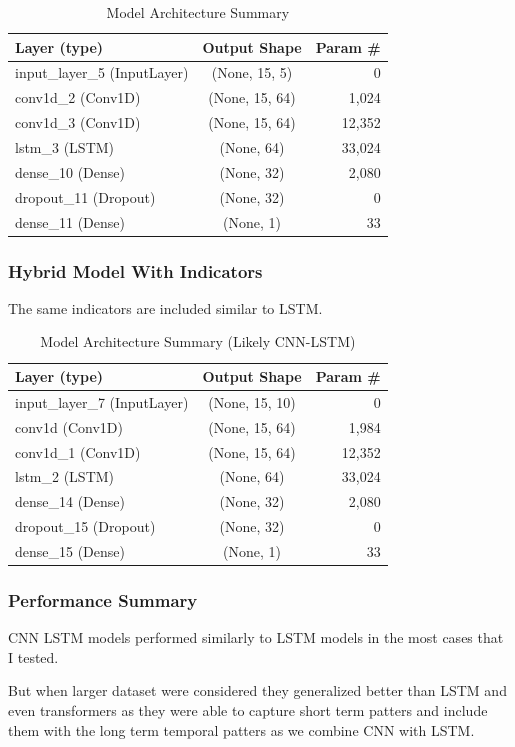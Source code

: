 \begin{table}[h]
\centering
\caption{Model Architecture Summary}
\label{tab:cnn_lstm_summary}
\begin{tabular}{|l|c|r|}
\hline
\textbf{Layer (type)} & \textbf{Output Shape} & \textbf{Param \#} \\
\hline
input\_layer\_5 (InputLayer) & (None, 15, 5) & 0 \\
\hline
conv1d\_2 (Conv1D) & (None, 15, 64) & 1,024 \\
\hline
conv1d\_3 (Conv1D) & (None, 15, 64) & 12,352 \\
\hline
lstm\_3 (LSTM) & (None, 64) & 33,024 \\
\hline
dense\_10 (Dense) & (None, 32) & 2,080 \\
\hline
dropout\_11 (Dropout) & (None, 32) & 0 \\
\hline
dense\_11 (Dense) & (None, 1) & 33 \\
\hline
\end{tabular}
\end{table}

\subsubsection{Hybrid Model With Indicators}

The same indicators are included similar to LSTM.

\begin{table}[h]
\centering
\caption{Model Architecture Summary (Likely CNN-LSTM)}
\label{tab:cnn_lstm_summary_2}
\begin{tabular}{|l|c|r|}
\hline
\textbf{Layer (type)} & \textbf{Output Shape} & \textbf{Param \#} \\
\hline
input\_layer\_7 (InputLayer) & (None, 15, 10) & 0 \\
\hline
conv1d (Conv1D) & (None, 15, 64) & 1,984 \\
\hline
conv1d\_1 (Conv1D) & (None, 15, 64) & 12,352 \\
\hline
lstm\_2 (LSTM) & (None, 64) & 33,024 \\
\hline
dense\_14 (Dense) & (None, 32) & 2,080 \\
\hline
dropout\_15 (Dropout) & (None, 32) & 0 \\
\hline
dense\_15 (Dense) & (None, 1) & 33 \\
\hline
\end{tabular}
\end{table}

\subsubsection{Performance Summary}

CNN LSTM models performed similarly to LSTM models in the most cases that I tested.

But when larger dataset were considered they generalized better than LSTM and even transformers as they were able to capture short term patters and include them with the long term temporal patters as we combine CNN with LSTM.